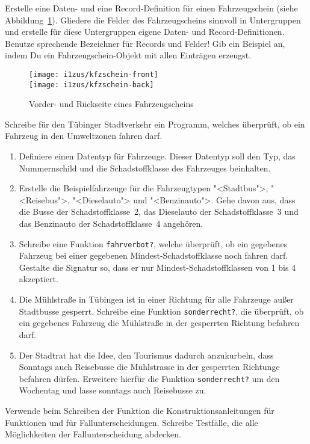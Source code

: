 \begin{aufgabe}

  Erstelle eine Daten- und eine Record-Definition für einen
    Fahrzeugschein (siehe Abbildung~\ref{fig:fahrzeugschein}).  Gliedere die Felder des
    Fahrzeugscheins sinnvoll in Untergruppen und erstelle für diese
    Untergruppen eigene Daten- und Record-Definitionen.  Benutze
    sprechende Bezeichner für Records und Felder!  Gib ein
    Beispiel an, indem Du ein Fahrzeugschein-Objekt mit allen Einträgen
    erzeugst.
    
    
    \begin{figure}[tb]
      \begin{center}
        \texttt{[image: i1zus/kfzschein-front]}\\
        \medskip
        \texttt{[image: i1zus/kfzschein-back]}
      \end{center}
      \caption{Vorder- und Rückseite eines Fahrzeugscheins}
      \label{fig:fahrzeugschein}
    \end{figure}
\end{aufgabe}

\begin{aufgabe}

  Schreibe für den Tübinger Stadtverkehr ein
  Programm, welches überprüft, ob ein Fahrzeug in den Umweltzonen fahren 
  darf.
  \begin{enumerate}
  \item Definiere einen Datentyp für Fahrzeuge. Dieser
    Datentyp soll den Typ, das Nummernschild und die Schadstoffklasse des
    Fahrzeuges beinhalten.
  \item Erstelle die Beispielfahrzeuge für die
    Fahrzeugtypen "<Stadtbus">, "<Reisebus">, "<Dieselauto">
    und "<Benzinauto">. Gehe davon aus, dass die Busse der
    Schadstoffklasse~2, das Dieselauto der Schadstoffklasse~3 und das
    Benzinauto der Schadstoffklasse~4 angehören.
  \item Schreibe eine Funktion \lstinline{fahrverbot?},
    welche überprüft, ob ein gegebenes Fahrzeug bei einer gegebenen
    Mindest-Schadstoffklasse noch fahren darf. Gestalte die Signatur
    so, dass er nur Mindest-Schadstoffklassen von 1 bis 4 akzeptiert.
  \item Die Mühlstraße in Tübingen ist in einer Richtung für
    alle Fahrzeuge außer Stadtbusse gesperrt. Schreibe eine Funktion
    \lstinline{sonderrecht?}, die überprüft, ob ein gegebenes Fahrzeug die
    Mühlstraße in der gesperrten Richtung befahren darf.  
  \item Der Stadtrat hat die Idee, den Tourismus
    dadurch anzukurbeln, dass Sonntags auch Reisebusse die Mühlstrasse in
    der gesperrten Richtunge befahren dürfen. Erweitere hierfür die
    Funktion \lstinline{sonderrecht?} um den Wochentag und lasse sonntags
    auch Reisebusse zu.
  \end{enumerate}
  Verwende beim Schreiben der Funktion die
  Konstruktionsanleitungen für Funktionen und für Fallunterscheidungen. 
  Schreibe Testfälle, die alle Möglichkeiten der   
  Fallunterscheidung abdecken.
  
\end{aufgabe}

